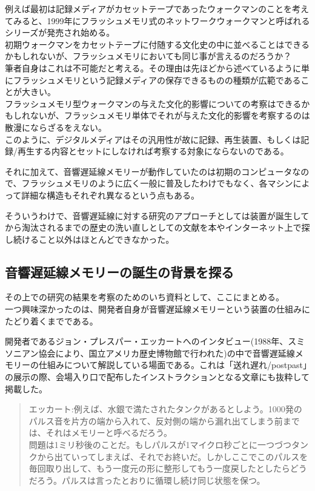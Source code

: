 例えば最初は記録メディアがカセットテープであったウォークマンのことを考えてみると、1999年にフラッシュメモリ式のネットワークウォークマンと呼ばれるシリーズが発売され始める。\\
初期ウォークマンをカセットテープに付随する文化史の中に並べることはできるかもしれないが、フラッシュメモリにおいても同じ事が言えるのだろうか？\\
筆者自身はこれは不可能だと考える。その理由は先ほどから述べているように単にフラッシュメモリという記録メディアの保存できるものの種類が広範であることが大きい。\\
フラッシュメモリ型ウォークマンの与えた文化的影響についての考察はできるかもしれないが、フラッシュメモリ単体でそれが与えた文化的影響を考察するのは散漫にならざるをえない。\\
このように、デジタルメディアはその汎用性が故に記録、再生装置、もしくは記録/再生する内容とセットにしなければ考察する対象にならないのである。

それに加えて、音響遅延線メモリーが動作していたのは初期のコンピュータなので、フラッシュメモリのように広く一般に普及したわけでもなく、各マシンによって詳細な構造もそれぞれ異なるという点もある。

そういうわけで、音響遅延線に対する研究のアプローチとしては装置が誕生してから淘汰されるまでの歴史の洗い直しとしての文献を本やインターネット上で探し続けること以外はほとんどできなかった。

\subsection{音響遅延線メモリーの誕生の背景を探る}\label{ux97f3ux97ffux9045ux5ef6ux7ddaux30e1ux30e2ux30eaux30fcux306eux8a95ux751fux306eux80ccux666fux3092ux63a2ux308b}

その上での研究の結果を考察のためのいち資料として、ここにまとめる。\\
一つ興味深かったのは、開発者自身が音響遅延線メモリーという装置の仕組みにたどり着くまでである。

開発者であるジョン・プレスパー・エッカートへのインタビュー(1988年、スミソニアン協会により、国立アメリカ歴史博物館で行われた)の中で音響遅延線メモリーの仕組みについて解説している場面である。これは「送れ\textbar{}遅れ/post\textbar{}past」の展示の際、会場入り口で配布したインストラクションとなる文章にも抜粋して掲載した。

\begin{quote}
エッカート:例えば、水銀で満たされたタンクがあるとしよう。1000発のパルス音を片方の端から入れて、反対側の端から漏れ出てしまう前までは、それはメモリーと呼べるだろう。\\
問題は1ミリ秒後のことだ。もしパルスが1マイクロ秒ごとに一つづつタンクから出ていってしまえば、それでお終いだ。しかしここでこのパルスを毎回取り出して、もう一度元の形に整形してもう一度戻したとしたらどうだろう。パルスは言ったとおりに循環し続け同じ状態を保つ。
\end{quote}

